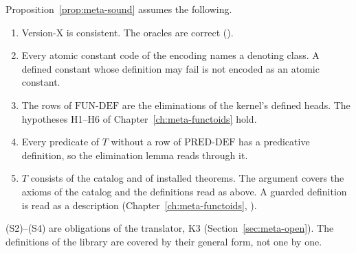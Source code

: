 Proposition~\ref{prop:meta-sound} assumes the following.
\begin{enumerate}
\item[(S1)] Version-X is consistent.  The oracles are correct
  ().
\item[(S2)] Every atomic constant code of the encoding names a
  denoting class.  A defined constant whose definition may fail is not
  encoded as an atomic constant.
\item[(S3)] The rows of $\mathrm{FUN\text{-}DEF}$ are the eliminations
  of the kernel's defined heads.  The hypotheses H1--H6 of
  Chapter~\ref{ch:meta-functoids} hold.
\item[(S4)] Every predicate of $T$ without a row of
  $\mathrm{PRED\text{-}DEF}$ has a predicative definition, so the
  elimination lemma reads through it.
\item[(S5)] $T$ consists of the catalog and of installed theorems.  The
  argument covers the axioms of the catalog and the definitions read
  as above.  A guarded definition is read as a description
  (Chapter~\ref{ch:meta-functoids}, ).
\end{enumerate}
(S2)--(S4) are obligations of the translator, K3
(Section~\ref{sec:meta-open}).  The definitions of the library are
covered by their general form, not one by one.
